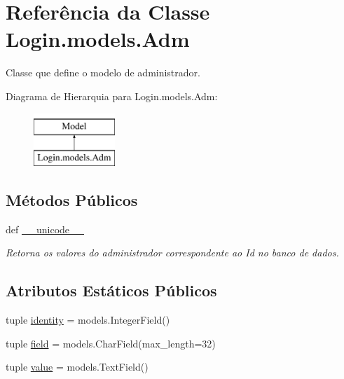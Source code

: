 \hypertarget{classLogin_1_1models_1_1Adm}{\section{Referência da Classe Login.\-models.\-Adm}
\label{d4/d48/classLogin_1_1models_1_1Adm}
}


Classe que define o modelo de administrador.  


Diagrama de Hierarquia para Login.\-models.\-Adm\-:\begin{figure}[H]
\begin{center}
\leavevmode
\includegraphics[height=2.000000cm]{d4/d48/classLogin_1_1models_1_1Adm}
\end{center}
\end{figure}
\subsection*{Métodos Públicos}
\begin{DoxyCompactItemize}
\item 
def \hyperlink{classLogin_1_1models_1_1Adm_ada4e6310631e567c265129a48fdc7240}{\-\_\-\-\_\-unicode\-\_\-\-\_\-}
\begin{DoxyCompactList}\small\item\em Retorna os valores do administrador correspondente ao Id no banco de dados. \end{DoxyCompactList}\end{DoxyCompactItemize}
\subsection*{Atributos Estáticos Públicos}
\begin{DoxyCompactItemize}
\item 
tuple \hyperlink{classLogin_1_1models_1_1Adm_a304ca44602e775ea01d2e814c2dbb670}{identity} = models.\-Integer\-Field()
\item 
tuple \hyperlink{classLogin_1_1models_1_1Adm_acbc72ad1229824e3368db724871d6fdc}{field} = models.\-Char\-Field(max\-\_\-length=32)
\item 
tuple \hyperlink{classLogin_1_1models_1_1Adm_ad783913f8b33250180f9f562ff56b0c9}{value} = models.\-Text\-Field()
\end{DoxyCompactItemize}


